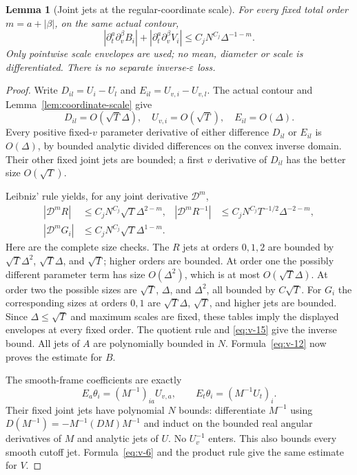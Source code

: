 \documentclass[11pt]{article}
\numberwithin{equation}{section}
\newtheorem{lemma}[theorem]{Lemma}
\theoremstyle{remark}\newtheorem{remark}[theorem]{Remark}
\begin{document}
\begin{lemma}[Joint jets at the regular-coordinate scale]\label{lem:jets}
For every fixed total order $m=a+|\beta|$, on the same actual contour,
\begin{equation}\label{eq:v-14}
 |\partial_t^a\partial_v^\beta B_i|
 +|\partial_t^a\partial_v^\beta V_i|
 \le C_jN^{C_j}\Delta^{-1-m}.
\end{equation}
Only pointwise scale envelopes are used; no mean, diameter or scale is
differentiated. There is no separate inverse-$\varepsilon$ loss.
\end{lemma}
\begin{proof}
Write $D_{il}=U_i-U_l$ and $E_{il}=U_{v,i}-U_{v,l}$.
The actual contour and Lemma~\ref{lem:coordinate-scale} give
\[
 D_{il}=O(\sqrt T\Delta),\quad U_{v,i}=O(\sqrt T),\quad
 E_{il}=O(\Delta).
\]
Every positive fixed-$v$ parameter derivative of either difference
$D_{il}$ or $E_{il}$ is $O(\Delta)$, by bounded analytic divided
differences on the convex inverse domain. Their other fixed joint
jets are bounded; a first $v$ derivative of $D_{il}$ has the
better size $O(\sqrt T)$.

Leibniz' rule yields, for any joint derivative $\mathcal D^m$,
\begin{equation}\label{eq:sharp-R}
 \begin{aligned}
 |\mathcal D^mR|&\le C_jN^{C_j}\sqrt T\Delta^{2-m},&
 |\mathcal D^mR^{-1}|&\le C_jN^{C_j}T^{-1/2}\Delta^{-2-m},\\
 |\mathcal D^mG_i|&\le C_jN^{C_j}\sqrt T\Delta^{1-m}.&&
 \end{aligned}
\end{equation}
Here are the complete size checks. The $R$ jets at orders
$0,1,2$ are bounded by
$\sqrt T\Delta^2$, $\sqrt T\Delta$, and $\sqrt T$;
higher orders are bounded. At order one the possibly different
parameter term has size $O(\Delta^2)$, which is at most
$O(\sqrt T\Delta)$. At order two the possible sizes are
$\sqrt T$, $\Delta$, and $\Delta^2$, all bounded by
$C\sqrt T$. For $G_i$ the corresponding sizes at orders
$0,1$ are $\sqrt T\Delta$, $\sqrt T$, and higher jets are
bounded. Since $\Delta\le\sqrt T$ and maximum scales are
fixed, these tables imply the displayed envelopes at every fixed
order. The quotient rule and \eqref{eq:v-15} give the inverse
bound. All jets of $A$ are polynomially bounded in $N$.
Formula~\eqref{eq:v-12} now proves the estimate for $B$.

The smooth-frame coefficients are exactly
\[
 E_a\theta_i=(M^{-1})_{ia}U_{v,a},\qquad
 E_t\theta_i=(M^{-1}U_t)_i.
\]
Their fixed joint jets have polynomial $N$ bounds: differentiate
$M^{-1}$ using $D(M^{-1})=-M^{-1}(DM)M^{-1}$ and induct on
the bounded real angular derivatives of $M$ and analytic jets of $U$.
No $U_v^{-1}$ enters. This also bounds every smooth cutoff jet.
Formula~\eqref{eq:v-6} and the product rule give the same
estimate for $V$.
\end{proof}
\end{document}

